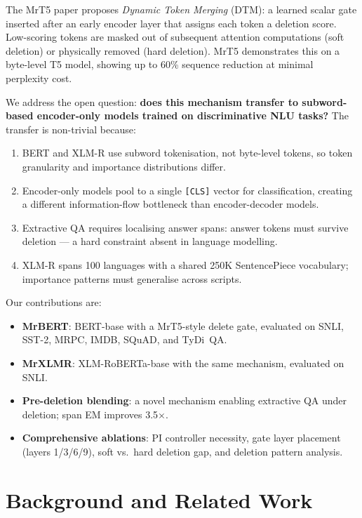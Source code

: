 \documentclass[11pt,a4paper]{article}
\begin{document}
The MrT5 paper \citep{kallini2024mrt5} proposes \emph{Dynamic Token Merging} (DTM): a learned scalar gate inserted after an early encoder layer that assigns each token a deletion score. Low-scoring tokens are masked out of subsequent attention computations (soft deletion) or physically removed (hard deletion). MrT5 demonstrates this on a byte-level T5 model, showing up to 60\% sequence reduction at minimal perplexity cost.

We address the open question: \textbf{does this mechanism transfer to subword-based encoder-only models trained on discriminative NLU tasks?} The transfer is non-trivial because:

\begin{enumerate}[nosep]
    \item BERT and XLM-R use subword tokenisation, not byte-level tokens, so token granularity and importance distributions differ.
    \item Encoder-only models pool to a single \texttt{[CLS]} vector for classification, creating a different information-flow bottleneck than encoder-decoder models.
    \item Extractive QA requires localising answer spans: answer tokens must survive deletion --- a hard constraint absent in language modelling.
    \item XLM-R spans 100 languages with a shared 250K SentencePiece vocabulary; importance patterns must generalise across scripts.
\end{enumerate}


\noindent Our contributions are:
\begin{itemize}[nosep]
    \item \textbf{MrBERT}: BERT-base with a MrT5-style delete gate, evaluated on SNLI, SST-2, MRPC, IMDB, SQuAD, and TyDi~QA.
    \item \textbf{MrXLMR}: XLM-RoBERTa-base with the same mechanism, evaluated on SNLI.
    \item \textbf{Pre-deletion blending}: a novel mechanism enabling extractive QA under deletion; span EM improves 3.5$\times$.
    \item \textbf{Comprehensive ablations}: PI controller necessity, gate layer placement (layers 1/3/6/9), soft vs.\ hard deletion gap, and deletion pattern analysis.
\end{itemize}


\section{Background and Related Work}
\label{sec:related-work}
\end{document}
